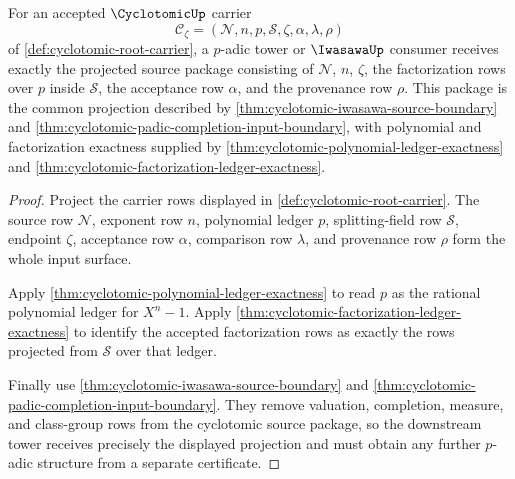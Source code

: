 \begin{theorem}
\label{thm:cyclotomic-padic-tower-consumer-exactness}
For an accepted $\CyclotomicUp$ carrier
$$
\mathcal{C}_{\zeta}=(\mathcal{N},n,p,\mathcal{S},\zeta,\alpha,\lambda,\rho)
$$
of \autoref{def:cyclotomic-root-carrier}, a $p$-adic tower or $\IwasawaUp$ consumer receives exactly the projected source package consisting of $\mathcal{N}$, $n$, $\zeta$, the factorization rows over $p$ inside $\mathcal{S}$, the acceptance row $\alpha$, and the provenance row $\rho$. This package is the common projection described by \autoref{thm:cyclotomic-iwasawa-source-boundary} and \autoref{thm:cyclotomic-padic-completion-input-boundary}, with polynomial and factorization exactness supplied by \autoref{thm:cyclotomic-polynomial-ledger-exactness} and \autoref{thm:cyclotomic-factorization-ledger-exactness}.
\end{theorem}
\begin{proof}
Project the carrier rows displayed in \autoref{def:cyclotomic-root-carrier}. The source row $\mathcal{N}$, exponent row $n$, polynomial ledger $p$, splitting-field row $\mathcal{S}$, endpoint $\zeta$, acceptance row $\alpha$, comparison row $\lambda$, and provenance row $\rho$ form the whole input surface.

Apply \autoref{thm:cyclotomic-polynomial-ledger-exactness} to read $p$ as the rational polynomial ledger for $X^n-1$. Apply \autoref{thm:cyclotomic-factorization-ledger-exactness} to identify the accepted factorization rows as exactly the rows projected from $\mathcal{S}$ over that ledger.

Finally use \autoref{thm:cyclotomic-iwasawa-source-boundary} and \autoref{thm:cyclotomic-padic-completion-input-boundary}. They remove valuation, completion, measure, and class-group rows from the cyclotomic source package, so the downstream tower receives precisely the displayed projection and must obtain any further $p$-adic structure from a separate certificate.
\end{proof}

